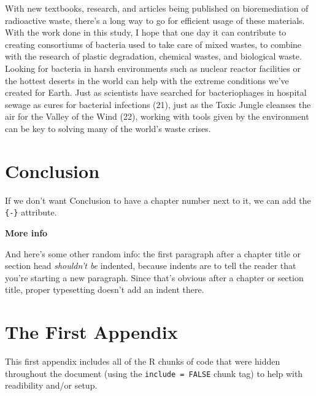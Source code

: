 \documentclass[12pt,twoside]{reedthesis}
\begin{document}
With new textbooks, research, and articles being published on bioremediation of radioactive waste, there's a long way to go for efficient usage of these materials. With the work done in this study, I hope that one day it can contribute to creating consortiums of bacteria used to take care of mixed wastes, to combine with the research of plastic degradation, chemical wastes, and biological waste. Looking for bacteria in harsh environments such as nuclear reactor facilities or the hottest deserts in the world can help with the extreme conditions we've created for Earth. Just as scientists have searched for bacteriophages in hospital sewage as cures for bacterial infections (21), just as the Toxic Jungle cleanses the air for the Valley of the Wind (22), working with tools given by the environment can be key to solving many of the world's waste crises.

\hypertarget{conclusion-1}{%
\chapter*{Conclusion}\label{conclusion-1}}

If we don't want Conclusion to have a chapter number next to it, we can add the \texttt{\{-\}} attribute.

\textbf{More info}

And here's some other random info: the first paragraph after a chapter title or section head \emph{shouldn't be} indented, because indents are to tell the reader that you're starting a new paragraph. Since that's obvious after a chapter or section title, proper typesetting doesn't add an indent there.

\appendix

\hypertarget{the-first-appendix}{%
\chapter{The First Appendix}\label{the-first-appendix}}

This first appendix includes all of the R chunks of code that were hidden throughout the document (using the \texttt{include\ =\ FALSE} chunk tag) to help with readibility and/or setup.
\end{document}
